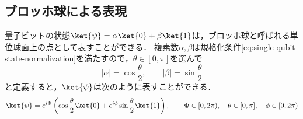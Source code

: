 


\subsection{ブロッホ球による表現}
\label{subsec:bloch-sphere}

量子ビットの状態$\ket{\psi} = \alpha\ket{0} + \beta\ket{1}$は，ブロッホ球と呼ばれる単位球面上の点として表すことができる．
複素数$\alpha, \beta$は規格化条件\eqref{eq:single-qubit-state-normalization}を満たすので，$\theta \in [0,\pi]$を選んで
\begin{equation*}
  |\alpha| = \cos\frac{\theta}{2}, \qquad |\beta| = \sin\frac{\theta}{2}
\end{equation*}
と定義すると，$\ket{\psi}$は次のように表すことができる．
\begin{equation}
  \ket{\psi} = e^{i\Phi} \left( \cos\frac{\theta}{2}\ket{0} + e^{i\phi}\sin\frac{\theta}{2}\ket{1} \right),
  \qquad \Phi \in [0,2\pi),\quad \theta \in [0,\pi], \quad \phi \in [0,2\pi)
  \label{eq:qubit-angular-representation}
\end{equation}

